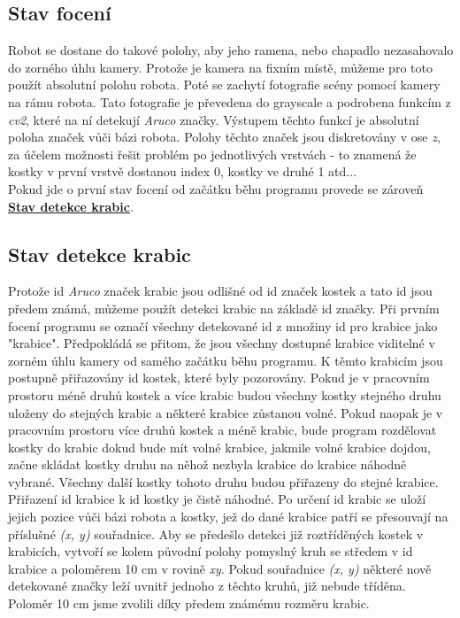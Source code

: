 \documentclass[journal,twoside,web]{ieeecolor}
\begin{document}
        \hypertarget{capturing_state}{\subsection{Stav focení}}
            Robot se dostane do takové polohy, aby jeho ramena, nebo chapadlo nezasahovalo do zorného úhlu kamery. Protože
            je kamera na fixním místě, můžeme pro toto použít absolutní polohu robota. Poté se zachytí fotografie scény pomocí
            kamery na rámu robota. Tato fotografie je převedena do grayscale a podrobena funkcím z \textit{cv2}, které na ní detekují \textit{Aruco}
            značky. Výstupem těchto funkcí je absolutní poloha značek vůči bázi robota. Polohy těchto značek jsou
            diskretovány v ose \textit{z}, za účelem možnosti řešit problém po jednotlivých vrstvách - to znamená že kostky v první vrstvě dostanou
            index 0, kostky ve druhé 1 atd...\\
            Pokud jde o první stav focení od začátku běhu programu provede se zároveň \hyperlink{stav_detekce_krabic}{\textbf{Stav detekce krabic}}.

        \hypertarget{stav_detekce_krabic}{\subsection{Stav detekce krabic}}
            Protože id \textit{Aruco} značek krabic jsou odlišné od id značek kostek a tato id jsou předem známá, můžeme použít detekci krabic na
            základě id značky. Při prvním focení programu se označí všechny detekované id z množiny id pro krabice jako "krabice". Předpokládá se přitom, že
            jsou všechny dostupné krabice viditelné v zorném úhlu kamery od samého začátku běhu programu. K těmto krabicím jsou postupně přiřazovány id kostek,
            které byly pozorovány. Pokud je v pracovním prostoru méně druhů kostek a více krabic budou všechny kostky stejného druhu uloženy do stejných krabic
            a některé krabice zůstanou volné. Pokud naopak je v pracovním prostoru více druhů kostek a méně krabic, bude program rozdělovat kostky do krabic dokud
            bude mít volné krabice, jakmile volné krabice dojdou, začne skládat kostky druhu na něhož nezbyla krabice do krabice náhodně vybrané. Všechny další
            kostky tohoto druhu budou přiřazeny do stejné krabice. Přiřazení id krabice k id kostky je čistě náhodné. Po určení id krabic se uloží jejich pozice vůči
            bázi robota a kostky, jež do dané krabice patří se přesouvají na příslušné \textit{(x, y)} souřadnice. Aby se předešlo detekci již roztříděných kostek v
            krabicích, vytvoří se kolem původní polohy pomyslný kruh se středem v id krabice a poloměrem 10 cm v rovině \textit{xy}. Pokud souřadnice \textit{(x, y)}
            některé nově detekované značky leží uvnitř jednoho z těchto kruhů, již nebude tříděna. Poloměr 10 cm jsme zvolili díky předem známému rozměru krabic.
\end{document}
